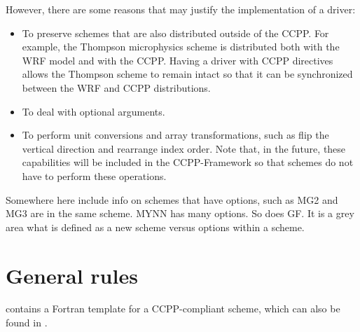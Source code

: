 \documentclass[letterpaper,10pt,english]{sphinxmanual}
\begin{document}
However, there are some reasons that may justify the implementation of a driver:
\begin{itemize}
\item {} 
To preserve schemes that are also distributed outside of the CCPP. For example, the Thompson
microphysics scheme is distributed both with the WRF model and with the CCPP. Having a driver
with CCPP directives allows the Thompson scheme to remain intact so that it can be synchronized
between the WRF and CCPP distributions.

\item {} 
To deal with optional arguments.

\item {} 
To perform unit conversions and array transformations, such as flip the vertical direction
and rearrange index order. Note that, in the future, these capabilities will be included
in the CCPP-Framework so that schemes do not have to perform these operations.

\end{itemize}

Somewhere here include info on schemes that have options, such as MG2 and MG3 are in the same
scheme.  MYNN has many options.  So does GF.  It is a grey area what is defined as a new scheme
versus options within a scheme.


\section{General rules}
\label{\detokenize{CompliantPhysicsParams:general-rules}}
{\hyperref[\detokenize{CompliantPhysicsParams:scheme-template}]{}} contains a Fortran template for a CCPP-compliant scheme, which can also
be found in .
\end{document}
